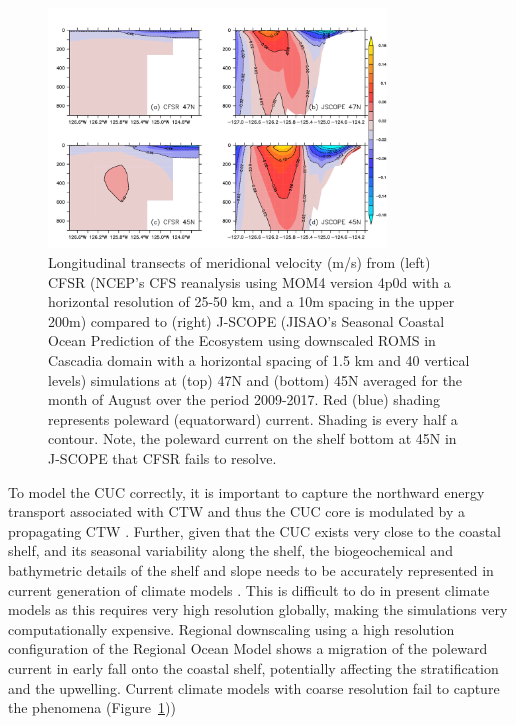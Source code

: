 \begin{figure}[h]
  \centering
  \includegraphics[width=0.8\textwidth]{CUC_obs_CFSR.pdf}
  \caption{Longitudinal transects of meridional velocity (m/s) from (left) CFSR (NCEP's CFS reanalysis \citep{saha2010ncep} using MOM4 version 4p0d \citep{griffies2004technical} with a horizontal resolution of 25-50 km, and a 10m spacing in the upper 200m) compared to (right) J-SCOPE  (JISAO's Seasonal Coastal Ocean Prediction of the Ecosystem \citep{siedlecki2016experiments} using downscaled ROMS in Cascadia domain  with a horizontal spacing of 1.5 km and 40 vertical levels) simulations at (top) 47N and (bottom) 45N averaged for the month of August over the period 2009-2017. Red (blue) shading represents poleward (equatorward) current. Shading is every half a contour. Note, the poleward current on the shelf bottom at 45N in J-SCOPE that CFSR fails to resolve.}
  \label{fig:CUC}
\end{figure}

To model the CUC correctly, it is important to capture the northward energy transport associated with CTW \citep{connolly2014coastal} and thus the CUC core is modulated by a propagating CTW \citep{connolly2014coastal,stone2018effect}. Further, given that the CUC exists very close to the coastal shelf, and its seasonal variability along the shelf, the biogeochemical and bathymetric details of the shelf and slope needs to be accurately represented in current generation of climate models \citep{durski2017influence,thomson2010poleward,hickey2016alongcoast,bograd2019water}.   This is difficult to do in present climate models as this requires very high resolution globally, making the simulations very computationally expensive. Regional downscaling using a high resolution configuration of the Regional Ocean Model shows a migration of the poleward current in early fall onto the coastal shelf, potentially affecting the stratification and the upwelling.  Current climate models with coarse resolution fail to capture the phenomena (Figure~\ref{fig:CUC}))  

